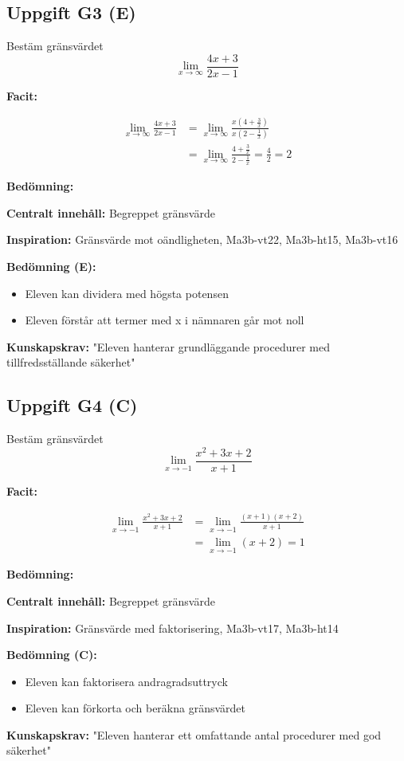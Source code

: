 \documentclass[12pt]{article}
\begin{document}
\subsection*{Uppgift G3 (E)}
Bestäm gränsvärdet
\[
\lim_{x \to \infty} \frac{4x + 3}{2x - 1}
\]

\begin{facitbox}
\textbf{Facit:}

\begin{align*}
\lim_{x \to \infty} \frac{4x + 3}{2x - 1} &= \lim_{x \to \infty} \frac{x(4 + \frac{3}{x})}{x(2 - \frac{1}{x})} \\
&= \lim_{x \to \infty} \frac{4 + \frac{3}{x}}{2 - \frac{1}{x}} = \frac{4}{2} = 2
\end{align*}
\end{facitbox}

\begin{refbox}
\textbf{Bedömning:}

\textbf{Centralt innehåll:} Begreppet gränsvärde

\textbf{Inspiration:} Gränsvärde mot oändligheten, Ma3b-vt22, Ma3b-ht15, Ma3b-vt16

\textbf{Bedömning (E):}
\begin{itemize}
    \item Eleven kan dividera med högsta potensen
    \item Eleven förstår att termer med x i nämnaren går mot noll
\end{itemize}

\textbf{Kunskapskrav:} "Eleven hanterar grundläggande procedurer med tillfredsställande säkerhet"
\end{refbox}

\subsection*{Uppgift G4 (C)}
Bestäm gränsvärdet
\[
\lim_{x \to -1} \frac{x^2 + 3x + 2}{x + 1}
\]

\begin{facitbox}
\textbf{Facit:}

\begin{align*}
\lim_{x \to -1} \frac{x^2 + 3x + 2}{x + 1} &= \lim_{x \to -1} \frac{(x + 1)(x + 2)}{x + 1} \\
&= \lim_{x \to -1} (x + 2) = 1
\end{align*}
\end{facitbox}

\begin{refbox}
\textbf{Bedömning:}

\textbf{Centralt innehåll:} Begreppet gränsvärde

\textbf{Inspiration:} Gränsvärde med faktorisering, Ma3b-vt17, Ma3b-ht14

\textbf{Bedömning (C):}
\begin{itemize}
    \item Eleven kan faktorisera andragradsuttryck
    \item Eleven kan förkorta och beräkna gränsvärdet
\end{itemize}

\textbf{Kunskapskrav:} "Eleven hanterar ett omfattande antal procedurer med god säkerhet"
\end{refbox}
\end{document}
